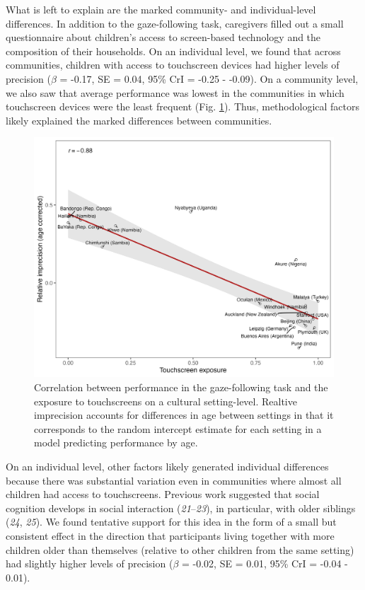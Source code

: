 \documentclass[
  man,floatsintext]{apa6}
\begin{document}
What is left to explain are the marked community- and individual-level differences. In addition to the gaze-following task, caregivers filled out a small questionnaire about children's access to screen-based technology and the composition of their households. On an individual level, we found that across communities, children with access to touchscreen devices had higher levels of precision (\(\beta\) = -0.17, SE = 0.04, 95\% CrI = -0.25 - -0.09). On a community level, we also saw that average performance was lowest in the communities in which touchscreen devices were the least frequent (Fig. \ref{fig:fig3}). Thus, methodological factors likely explained the marked differences between communities.

\begin{figure}

{\centering \includegraphics[width=0.5\linewidth]{../visuals/pcomtc} 

}

\caption{Correlation between performance in the gaze-following task and the exposure to touchscreens on a cultural setting-level. Realtive imprecision accounts for differences in age between settings in that it corresponds to the random intercept estimate for each setting in a model predicting performance by age.}\label{fig:fig3}
\end{figure}

On an individual level, other factors likely generated individual differences because there was substantial variation even in communities where almost all children had access to touchscreens. Previous work suggested that social cognition develops in social interaction (\emph{21}--\emph{23}), in particular, with older siblings (\emph{24}, \emph{25}). We found tentative support for this idea in the form of a small but consistent effect in the direction that participants living together with more children older than themselves (relative to other children from the same setting) had slightly higher levels of precision (\(\beta\) = -0.02, SE = 0.01, 95\% CrI = -0.04 - 0.01).
\end{document}
